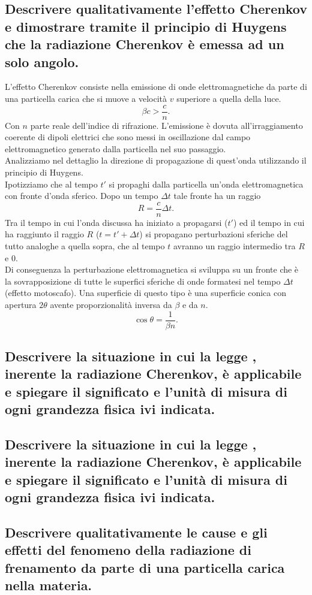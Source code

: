 \subsection[]{Descrivere qualitativamente l’effetto Cherenkov e dimostrare tramite il principio di Huygens che la radiazione Cherenkov è emessa ad un solo angolo.
}
L'effetto Cherenkov consiste nella emissione di onde elettromagnetiche da parte di una particella carica che si muove a velocità $v$ superiore a quella della luce.
\[
	\beta c> \frac{c}{n}
.\] 
Con $n$ parte reale dell'indice di rifrazione. L'emissione è dovuta all'irraggiamento coerente di dipoli elettrici che sono messi in oscillazione dal campo elettromagnetico generato dalla particella nel suo passaggio.\\
Analizziamo nel dettaglio la direzione di propagazione di quest'onda utilizzando il principio di Huygens.\\
Ipotizziamo che al tempo $t'$ si propaghi dalla particella un'onda elettromagnetica con fronte d'onda sferico. Dopo un tempo $\Delta t$ tale fronte ha un raggio 
\[
	R = \frac{c}{n} \Delta t
.\] 
Tra il tempo in cui l'onda discussa ha iniziato a propagarsi ($t'$) ed il tempo in cui ha raggiunto il raggio $R$ ($t = t'+ \Delta t$) si propagano perturbazioni sferiche del tutto analoghe a quella sopra, che al tempo $t$ avranno un raggio intermedio tra $R$ e $0$.\\
Di conseguenza la perturbazione elettromagnetica si sviluppa su un fronte che è la sovrapposizione di tutte le superfici sferiche di onde formatesi nel tempo $\Delta t$ (effetto motoscafo).
Una superficie di questo tipo è una superficie conica con apertura $2\theta$ avente proporzionalità inversa da $\beta$ e da $n$.
 \[
	\cos\theta = \frac{1}{\beta n}
.\] 


\subsection[]{Descrivere la situazione in cui la legge 
	, inerente la radiazione Cherenkov, è applicabile e spiegare il significato e l'unità di misura di ogni grandezza fisica ivi indicata.
}
\subsection[]{Descrivere la situazione in cui la legge 
	, inerente la radiazione Cherenkov, è applicabile e spiegare il significato e l'unità di misura di ogni grandezza fisica ivi indicata.
}
\subsection[]{Descrivere qualitativamente le cause e gli effetti del fenomeno della radiazione di frenamento da parte di una particella carica nella materia.
}
